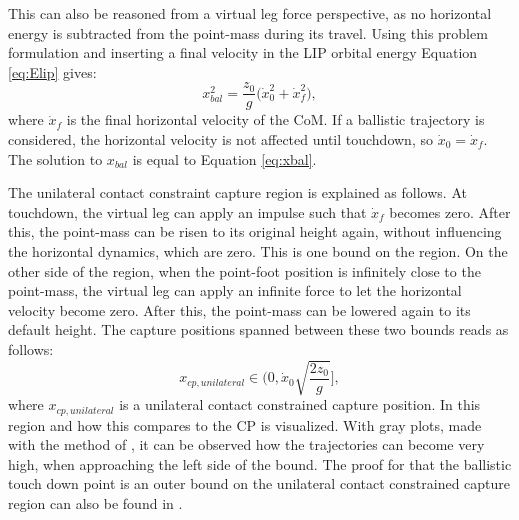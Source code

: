 This can also be reasoned from a virtual leg force perspective, as no horizontal energy is subtracted from the point-mass during its travel. Using this problem formulation and inserting a final velocity in the \ac{LIP} orbital energy Equation \eqref{eq:Elip} gives:
\begin{equation}
   x_{bal}^2 = \frac{z_0}{g}\big(\dot{x}_0^2 + \dot{x}_f^2\big), 
\end{equation}
where $\dot{x}_f$ is the final horizontal velocity of the \ac{CoM}. If a ballistic trajectory is considered, the horizontal velocity is not affected until touchdown, so $\dot{x}_0=\dot{x}_f$. The solution to $x_{bal}$ is equal to Equation \ref{eq:xbal}.

The unilateral contact constraint capture region is explained as follows. At touchdown, the virtual leg can apply an impulse such that $\dot{x}_f$ becomes zero. After this, the point-mass can be risen to its original height again, without influencing the horizontal dynamics, which are zero. This is one bound on the region. On the other side of the region, when the point-foot position is infinitely close to the point-mass, the virtual leg can apply an infinite force to let the horizontal velocity become zero. After this, the point-mass can be lowered again to its default height. The capture positions spanned between these two bounds reads as follows:
\begin{equation}
x_{cp,unilateral} \in \Bigg(0, \dot{x}_0\sqrt{\frac{2z_0}{g}} \Bigg],
\label{eq:xcpuni}
\end{equation}
where $x_{cp,unilateral}$ is a unilateral contact constrained capture position. In  this region and how this compares to the \ac{CP} is visualized. With gray plots, made with the method of \cite{koolen2016balance}, it can be observed how the trajectories can become very high, when approaching the left side of the bound. The proof for that the ballistic touch down point is an outer bound on the unilateral contact constrained capture region can also be found in \cite{koolen2016balance}.

